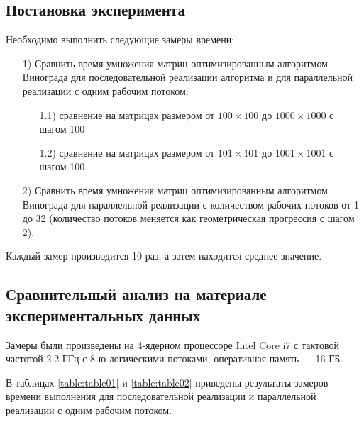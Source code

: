 \documentclass[a4paper,12pt]{article}
\begin{document}
    \subsection{Постановка эксперимента}
    
    Необходимо выполнить следующие замеры времени:
    \begin{enumerate} 
        \item[1)] Сравнить время умножения матриц оптимизированным алгоритмом Винограда для последовательной реализации алгоритма и для параллельной реализации с одним рабочим потоком:
        \begin{enumerate}
        \item[1.1)] сравнение на матрицах размером от $100 \times 100$ до $1000 \times 1000$ с шагом 100
        \item[1.2)] сравнение на матрицах размером от $101 \times 101$ до $1001 \times 1001$ с шагом 100
        \end{enumerate}
        \item[2)] Сравнить время умножения матриц оптимизированным алгоритмом Винограда для параллельной реализации с количеством рабочих потоков от 1 до 32 (количество потоков меняется как геометрическая прогрессия с шагом 2).
    \end{enumerate}
    
    Каждый замер производится 10 раз, а затем находится среднее значение. 
    
    
    \subsection{Сравнительный анализ на материале экспериментальных данных}
    	Замеры были произведены на 4-ядерном процессоре Intel Core i7 с тактовой частотой 2,2 ГГц с 8-ю логическими потоками, оперативная память — 16 ГБ.
    	
    	В таблицах \ref{table:table01} и  \ref{table:table02} приведены результаты замеров времени выполнения для последовательной реализации и параллельной реализации с одним рабочим потоком.
    	
\end{document}
